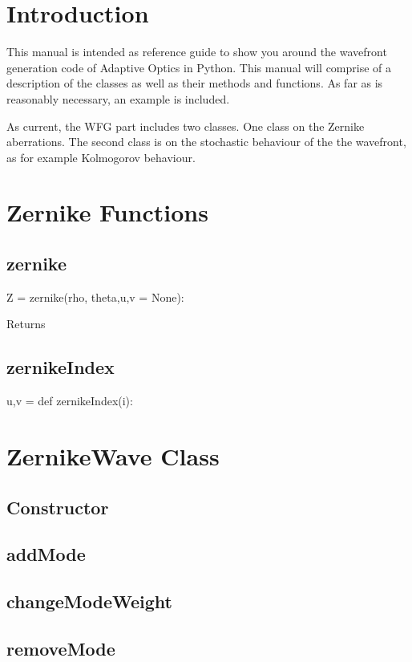 \documentclass{article}
\begin{document}
\section{Introduction}
This manual is intended as reference guide to show you around the wavefront generation code of Adaptive Optics in Python. This manual will comprise of a description of the classes as well as their methods and functions. As far as is reasonably necessary, an example is included.

As current, the WFG part includes two classes. One class on the Zernike aberrations. The second class is on the stochastic behaviour of the the wavefront, as for example Kolmogorov behaviour.

\newpage
\lstset{language=Python} 
\section{Zernike Functions}
\subsection{zernike}
Z = zernike(rho, theta,u,v = None):

Returns


\subsection{zernikeIndex}
u,v = def zernikeIndex(i):


\section{ZernikeWave Class}
\subsection{Constructor}

\subsection{addMode}

\subsection{changeModeWeight}

\subsection{removeMode}
\end{document}
